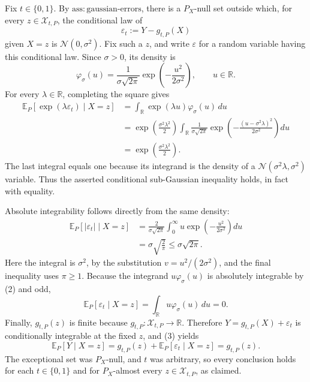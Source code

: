 Fix \(t\in\{0,1\}\). By \(\mathrm{ass:gaussian\text{-}errors}\), there is a \(P_X\)-null set outside which, for every \(z\in\mathcal X_{t,P}\), the conditional law of
\[
 \varepsilon_t:=Y-g_{t,P}(X)
\]
given \(X=z\) is \(\mathcal N(0,\sigma^2)\). Fix such a \(z\), and write \(\varepsilon\) for a random variable having this conditional law. Since \(\sigma>0\), its density is
\[
 \varphi_\sigma(u)=\frac{1}{\sigma\sqrt{2\pi}}
 \exp\!\left(-\frac{u^2}{2\sigma^2}\right),\qquad u\in\mathbb R.
\]
For every \(\lambda\in\mathbb R\), completing the square gives
\[
 \begin{aligned}
 \mathbb E_P[\exp(\lambda\varepsilon_t)\mid X=z]
 &=\int_{\mathbb R}\exp(\lambda u)\varphi_\sigma(u)\,du\\
 &=\exp\!\left(\frac{\sigma^2\lambda^2}{2}\right)
   \int_{\mathbb R}\frac{1}{\sigma\sqrt{2\pi}}
   \exp\!\left(-\frac{(u-\sigma^2\lambda)^2}{2\sigma^2}\right)du\\
 &=\exp\!\left(\frac{\sigma^2\lambda^2}{2}\right).
 \end{aligned}
 \tag{1}
\]
The last integral equals one because its integrand is the density of a \(\mathcal N(\sigma^2\lambda,\sigma^2)\) variable. Thus the asserted conditional sub-Gaussian inequality holds, in fact with equality.

Absolute integrability follows directly from the same density:
\[
 \begin{aligned}
 \mathbb E_P[|\varepsilon_t|\mid X=z]
 &=\frac{2}{\sigma\sqrt{2\pi}}
   \int_0^\infty u\exp\!\left(-\frac{u^2}{2\sigma^2}\right)du\\
 &=\sigma\sqrt{\frac{2}{\pi}}
 \le \sigma\sqrt{2\pi}.
 \end{aligned}
 \tag{2}
\]
Here the integral is \(\sigma^2\), by the substitution \(v=u^2/(2\sigma^2)\), and the final inequality uses \(\pi\ge1\). Because the integrand \(u\varphi_\sigma(u)\) is absolutely integrable by (2) and odd,
\[
 \mathbb E_P[\varepsilon_t\mid X=z]
 =\int_{\mathbb R}u\varphi_\sigma(u)\,du=0.
 \tag{3}
\]
Finally, \(g_{t,P}(z)\) is finite because \(g_{t,P}:\mathcal X_{t,P}\to\mathbb R\). Therefore \(Y=g_{t,P}(X)+\varepsilon_t\) is conditionally integrable at the fixed \(z\), and (3) yields
\[
 \mathbb E_P[Y\mid X=z]
 =g_{t,P}(z)+\mathbb E_P[\varepsilon_t\mid X=z]
 =g_{t,P}(z).
\]
The exceptional set was \(P_X\)-null, and \(t\) was arbitrary, so every conclusion holds for each \(t\in\{0,1\}\) and for \(P_X\)-almost every \(z\in\mathcal X_{t,P}\), as claimed.